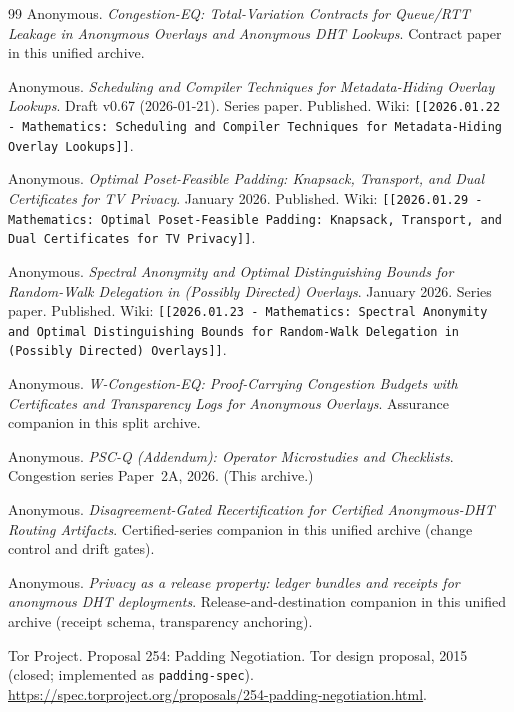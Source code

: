 \documentclass[11pt]{article}
\theoremstyle{definition}
\theoremstyle{remark}
\begin{document}
\begin{thebibliography}{99}
Anonymous.
\newblock \emph{Congestion-EQ: Total-Variation Contracts for Queue/RTT Leakage in Anonymous Overlays and Anonymous DHT Lookups}.
\newblock Contract paper in this unified archive.

Anonymous.
\newblock \emph{Scheduling and Compiler Techniques for Metadata-Hiding Overlay Lookups}.
\newblock Draft v0.67 (2026-01-21). Series paper.
\newblock Published. Wiki: \texttt{[[2026.01.22 - Mathematics: Scheduling and Compiler Techniques for Metadata-Hiding Overlay Lookups]]}.

Anonymous.
\newblock \emph{Optimal Poset-Feasible Padding: Knapsack, Transport, and Dual Certificates for TV Privacy}.
\newblock January 2026. Published. Wiki: \texttt{[[2026.01.29 - Mathematics: Optimal Poset-Feasible Padding: Knapsack, Transport, and Dual Certificates for TV Privacy]]}.

Anonymous.
\newblock \emph{Spectral Anonymity and Optimal Distinguishing Bounds for Random-Walk Delegation in (Possibly Directed) Overlays}.
\newblock January 2026. Series paper.
\newblock Published. Wiki: \texttt{[[2026.01.23 - Mathematics: Spectral Anonymity and Optimal Distinguishing Bounds for Random-Walk Delegation in (Possibly Directed) Overlays]]}.

Anonymous.
\newblock \emph{W-Congestion-EQ: Proof-Carrying Congestion Budgets with Certificates and Transparency Logs for Anonymous Overlays}.
\newblock Assurance companion in this split archive.

Anonymous.
\newblock \emph{PSC-Q (Addendum): Operator Microstudies and Checklists}.
\newblock Congestion series Paper~2A, 2026. (This archive.)

Anonymous.
\newblock \emph{Disagreement-Gated Recertification for Certified Anonymous-DHT Routing Artifacts}.
\newblock Certified-series companion in this unified archive (change control and drift gates).

Anonymous.
\newblock \emph{Privacy as a release property: ledger bundles and receipts for anonymous DHT deployments}.
\newblock Release-and-destination companion in this unified archive (receipt schema, transparency anchoring).

Tor Project.
\newblock Proposal 254: Padding Negotiation.
\newblock Tor design proposal, 2015 (closed; implemented as \texttt{padding-spec}).
\newblock \url{https://spec.torproject.org/proposals/254-padding-negotiation.html}.


\end{thebibliography}
\end{document}
